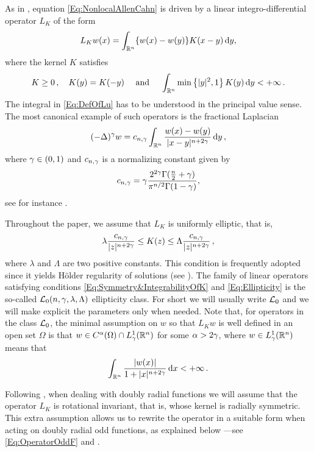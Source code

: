  
As in \cite{FelipeSanz-Perela:IntegroDifferentialI}, equation \eqref{Eq:NonlocalAllenCahn} is driven by a linear integro-differential operator $L_K$ of the form
\begin{equation}
\label{Eq:DefOfLu}
L_K w(x) = \int_{\mathbb{R}^n} \{w(x) - w(y)\} K(x-y)\,\mathrm{d} y,
\end{equation}
where the kernel $K$ satisfies
\begin{equation}
\label{Eq:Symmetry&IntegrabilityOfK}
K\geq 0\,, \quad K(y) = K(-y) \quad \textrm{ and } \quad \int_{\mathbb{R}^n} \min \left\{ |y|^2, 1 \right\} K(y) \,\mathrm{d} y < + \infty\,.
\end{equation}
The integral in \eqref{Eq:DefOfLu} has to be understood in the principal value sense. The most canonical example of such operators is the fractional Laplacian
$$
(-\Delta)^\gamma w = c_{n, \gamma} \int_{\mathbb{R}^n} \dfrac{w(x) - w(y)}{|x-y|^{n + 2\gamma}}\,\mathrm{d} y\,,
$$
where $\gamma \in (0,1)$ and $c_{n, \gamma}$ is a normalizing constant given by
\begin{equation}
  \label{Eq:ConstantFracLaplacian}
  c_{n,\gamma} = \gamma\dfrac{2^{2\gamma} \Gamma(\frac{n}{2}+\gamma) }{\pi^{n/2} \Gamma(1-\gamma)},
\end{equation}
see for instance \cite{BucurValdinoci}.

Throughout the paper, we assume that $L_K$ is uniformly elliptic, that is,
\begin{equation}
\label{Eq:Ellipticity}
\lambda \dfrac{c_{n,\gamma}}{|z|^{n+2\gamma}} \leq K(z) \leq \Lambda \dfrac{c_{n,\gamma}}{|z|^{n+2\gamma}}\,, 
\end{equation}
where $\lambda$ and $\Lambda$ are two positive constants. This condition is frequently adopted since it yields Hölder regularity of solutions (see \cite{RosOton-Survey,SerraC2s+alphaRegularity}). The family of linear operators satisfying conditions \eqref{Eq:Symmetry&IntegrabilityOfK} and \eqref{Eq:Ellipticity} is the so-called $\mathcal{L}_0(n,\gamma,\lambda, \Lambda)$ ellipticity class. For short we will usually write $\mathcal{L}_0$ and we will make explicit the parameters only when needed. Note that, for operators in the class $\mathcal{L}_0$, the minimal assumption on $w$ so that $L_K w$ is well defined in an open set $\Omega$ is that $w\in C^\alpha (\Omega)\cap L^1_\gamma(\mathbb{R}^n)$ for some $\alpha > 2\gamma$, where $w\in L^1_\gamma(\mathbb{R}^n)$ means that
$$
\int_{\mathbb{R}^n} \dfrac{|w(x)|}{1+|x|^{n+2\gamma}}\,\mathrm{d} x < +\infty\,.
$$


Following \cite{FelipeSanz-Perela:IntegroDifferentialI}, when dealing with doubly radial functions we will assume that the operator $L_K$ is rotational invariant, that is, whose kernel is radially symmetric. This extra assumption allows us to rewrite the operator in a suitable form when acting on doubly radial odd functions, as explained below ---see \eqref{Eq:OperatorOddF} and  \cite{FelipeSanz-Perela:IntegroDifferentialI}.




